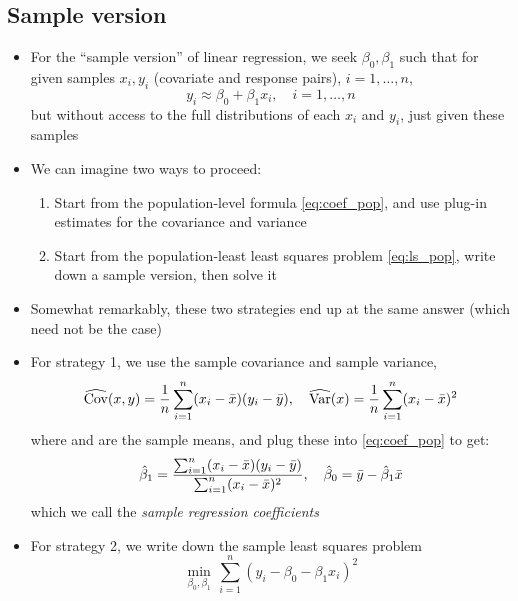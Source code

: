 \documentclass{article}
\begin{document}
\subsection{Sample version}

\begin{itemize}
\item For the ``sample version'' of linear regression, we seek $\beta_0,\beta_1$
  such that for given samples $x_i,y_i$ (covariate and response pairs), $i =
  1,\dots,n$,  
  \[
  y_i \approx \beta_0 + \beta_1 x_i, \quad i = 1,\dots,n
  \]
  but without access to the full distributions of each $x_i$ and $y_i$, just
  given these samples

\item We can imagine two ways to proceed:
  \begin{enumerate}
  \item Start from the population-level formula \eqref{eq:coef_pop}, and use 
    plug-in estimates for the covariance and variance
\item Start from the population-least least squares problem \eqref{eq:ls_pop},
  write down a sample version, then solve it
  \end{enumerate}

\item Somewhat remarkably, these two strategies end up at the same answer
  (which need not be the case)

\item For strategy 1, we use the sample covariance and sample variance, 
  \[
  \widehat{\operatorname{Cov}}(x,y) = \frac{1}{n} \sum_{i=1}^n (x_i - \bar{x}) (y_i -
  \bar{y}), \quad
  \widehat{\operatorname{Var}}(x) = \frac{1}{n} \sum_{i=1}^n (x_i - \bar{x})^2
  \]
  where  and  are the sample means, and plug these into
  \eqref{eq:coef_pop} to get:  
  \begin{equation}
  \label{eq:coef}
  \hat{\beta}_1 = \frac{\sum_{i=1}^n (x_i - \bar{x}) (y_i - \bar{y})} 
  {\sum_{i=1}^n (x_i - \bar{x})^2}, \quad 
  \hat{\beta}_0 = \bar{y} - \hat{\beta}_1 \bar{x}
  \end{equation}
  which we call the \emph{sample regression coefficients}

\item For strategy 2, we write down the sample least squares problem   
  \begin{equation}
  \label{eq:ls}
  \min_{\beta_0, \beta_1} \, \sum_{i=1}^n (y_i - \beta_0 - \beta_1 x_i)^2 
  \end{equation}
  

\end{itemize}
\end{document}
